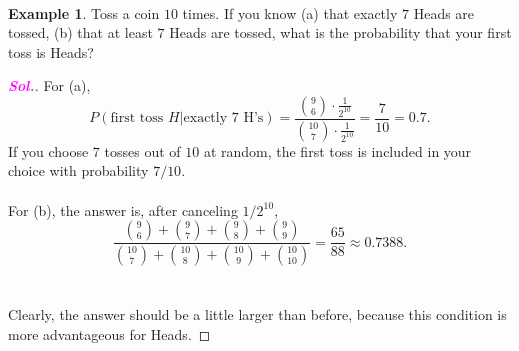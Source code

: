 \documentclass[12pt,a4paper]{article}
\theoremstyle{definition}
\newtheorem{example}{Example}[section]
\theoremstyle{definition}
\theoremstyle{definition}
\theoremstyle{definition}
\theoremstyle{remark}
\theoremstyle{definition}
\newcommand{\sol}{\textcolor{magenta}{\bf \textit{Sol.}}\quad}
\begin{document}
\
\begin{example}
	Toss a coin $10$ times. If you know (a) that exactly $7$ Heads are tossed, (b) that at least $7$ Heads are tossed, what is the probability that your first toss is Heads?\begin{proof}[\sol]
		For (a), \[
		P(\text{first toss $H$}|\text{exactly $7$ H's})=\frac{\binom{9}{6}\cdot\frac{1}{2^{10}}}{\binom{10}{7}\cdot\frac{1}{2^{10}}}=\frac{7}{10}=0.7.
		\] If you choose $7$ tosses out of $10$ at random, the first toss is included in your choice with probability $7/10$.\\
		\\
		For (b), the answer is, after canceling $1/2^{10}$, \[
		\frac{\binom{9}{6}+\binom{9}{7}+\binom{9}{8}+\binom{9}{9}}{\binom{10}{7}+\binom{10}{8}+\binom{10}{9}+\binom{10}{10}}=\frac{65}{88}\approx 0.7388.
		\]\\
		\\ Clearly, the answer should be a little larger than before, because this condition is more advantageous for Heads.
	\end{proof}
\end{example}
\end{document}
